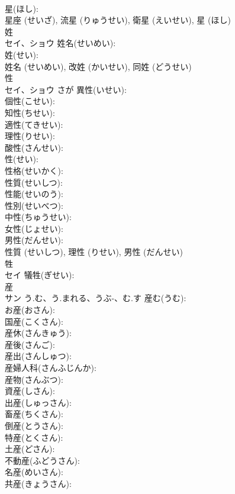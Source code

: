 \documentclass[8pt]{extreport}
\begin{document}
\begin{CJK}{UTF8}{min}
\\	星(ほし): 
\\	星座 (せいざ), 流星 (りゅうせい), 衛星 (えいせい), 星 (ほし)
\\	姓			
\\	セイ、ショウ		姓名(せいめい): 
\\	姓(せい): 
\\	姓名 (せいめい), 改姓 (かいせい), 同姓 (どうせい)
\\	性			
\\	セイ、ショウ	さが	異性(いせい): 
\\	個性(こせい): 
\\	知性(ちせい): 
\\	適性(てきせい): 
\\	理性(りせい): 
\\	酸性(さんせい): 
\\	性(せい): 
\\	性格(せいかく): 
\\	性質(せいしつ): 
\\	性能(せいのう): 
\\	性別(せいべつ): 
\\	中性(ちゅうせい): 
\\	女性(じょせい): 
\\	男性(だんせい): 
\\	性質 (せいしつ), 理性 (りせい), 男性 (だんせい)
\\	牲			
\\	セイ		犠牲(ぎせい): 
\\	産			
\\	サン	う.む、う.まれる、うぶ-、む.す	産む(うむ): 
\\	お産(おさん): 
\\	国産(こくさん): 
\\	産休(さんきゅう): 
\\	産後(さんご): 
\\	産出(さんしゅつ): 
\\	産婦人科(さんふじんか): 
\\	産物(さんぶつ): 
\\	資産(しさん): 
\\	出産(しゅっさん): 
\\	畜産(ちくさん): 
\\	倒産(とうさん): 
\\	特産(とくさん): 
\\	土産(どさん): 
\\	不動産(ふどうさん): 
\\	名産(めいさん): 
\\	共産(きょうさん): 

\end{CJK}
\end{document}
